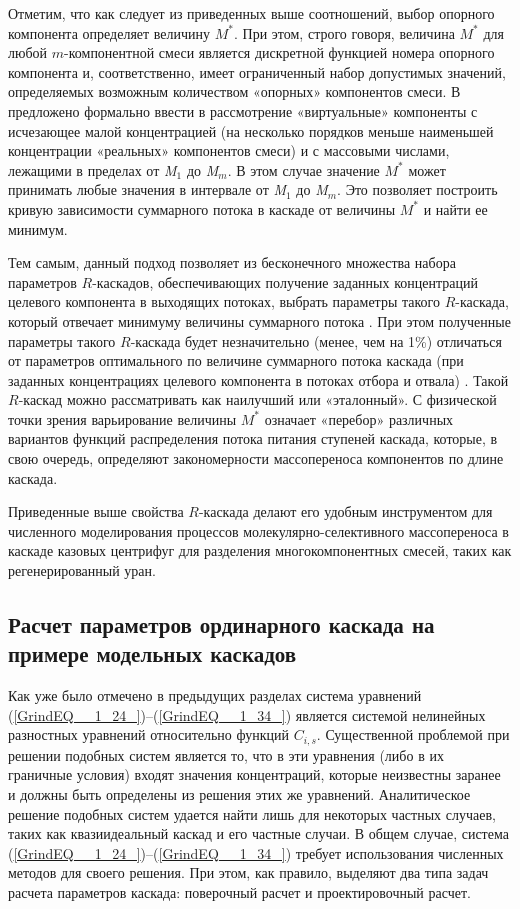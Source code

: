 Отметим, что как следует из приведенных выше соотношений, выбор опорного компонента определяет величину $M^{*}$. При этом, строго говоря, величина $M^{*}$ для любой $m$-компонентной смеси является дискретной функцией номера опорного компонента и, соответственно, имеет ограниченный набор допустимых значений, определяемых возможным количеством «опорных» компонентов смеси. В \cite{sulaberidzeSravnenieOptimalnyhModelnyh2008} предложено формально ввести в рассмотрение «виртуальные» компоненты с исчезающее малой концентрацией (на несколько порядков меньше наименьшей концентрации «реальных» компонентов смеси) и с массовыми числами, лежащими в пределах от \textit{M${}_{1}$} до \textit{M${}_{m}$}. В этом случае значение $M^{*}$ может принимать любые значения в интервале от \textit{M${}_{1}$} до \textit{M${}_{m}$}. Это позволяет построить кривую зависимости суммарного потока в каскаде от величины $M^{*}$ и найти ее минимум.

Тем самым, данный подход позволяет из бесконечного множества набора параметров $R$-каскадов, обеспечивающих получение заданных концентраций целевого компонента в выходящих потоках, выбрать параметры такого $R$-каскада, который отвечает минимуму величины суммарного потока \cite{sulaberidzeSravnenieOptimalnyhModelnyh2008}. При этом полученные параметры такого $R$-каскада будет незначительно (менее, чем на 1\%) отличаться от параметров оптимального по величине суммарного потока каскада (при заданных концентрациях целевого компонента в потоках отбора и отвала) \cite{songComparativeStudyModel2010}. Такой $R$-каскад можно рассматривать как наилучший или «эталонный». С физической точки зрения варьирование величины $M^{*}$ означает «перебор» различных вариантов функций распределения потока питания ступеней каскада, которые, в свою очередь, определяют закономерности массопереноса компонентов по длине каскада.

Приведенные выше свойства $R$-каскада делают его удобным инструментом для численного моделирования процессов молекулярно-селективного массопереноса в каскаде казовых центрифуг для разделения многокомпонентных смесей, таких как регенерированный уран.

\subsection{Расчет параметров ординарного каскада на примере модельных каскадов}\label{part2_discrep}

Как уже было отмечено в предыдущих разделах система уравнений (\ref{GrindEQ__1_24_})--(\ref{GrindEQ__1_34_}) является системой нелинейных разностных уравнений относительно функций $C_{i,s}$. Существенной проблемой при решении подобных систем является то, что в эти уравнения (либо в их граничные условия) входят значения концентраций, которые неизвестны заранее и должны быть определены из решения этих же уравнений. Аналитическое решение подобных систем удается найти лишь для некоторых частных случаев, таких как квазиидеальный каскад и его частные случаи. В общем случае, система (\ref{GrindEQ__1_24_})--(\ref{GrindEQ__1_34_}) требует использования численных методов для своего решения. При этом, как правило, выделяют два типа задач расчета параметров каскада: поверочный расчет и проектировочный расчет.

